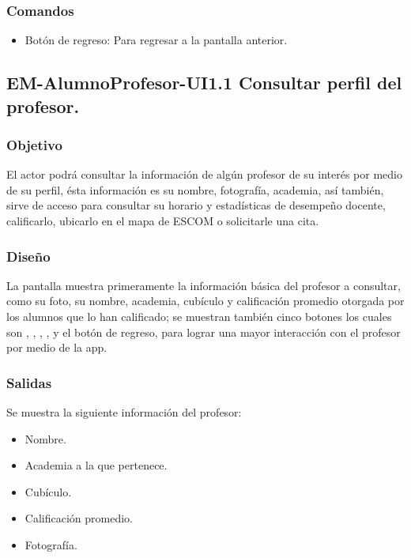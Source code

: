 \subsubsection{Comandos}
	\noindent
 	\begin{itemize}
		\item Botón de regreso: Para regresar a la pantalla anterior. 
	\end{itemize}



\pagebreak
\subsection{EM-AlumnoProfesor-UI1.1 Consultar perfil del profesor.}

\subsubsection{Objetivo}
	\noindent
	El actor podrá consultar la información de algún profesor de su interés por medio de su perfil, ésta información es su nombre, fotografía, academia, así también, sirve de acceso para consultar su horario y estadísticas de desempeño docente, calificarlo, ubicarlo en el mapa de ESCOM o solicitarle una cita. 


\subsubsection{Diseño}
	\noindent
	La pantalla muestra primeramente la información básica del profesor a consultar, como su foto, su nombre, academia, cubículo y calificación promedio otorgada por los alumnos que lo han calificado; se muestran también cinco botones los cuales son , , , ,  y el botón de regreso, para lograr una mayor interacción con el profesor por medio de la app.

\pagebreak
{}

\subsubsection{Salidas}
	\noindent
	Se muestra la siguiente información del profesor:
	\begin{itemize}
		\item Nombre.
		\item Academia a la que pertenece.
		\item Cubículo.
		\item Calificación promedio.
		\item Fotografía. 
	\end{itemize}

